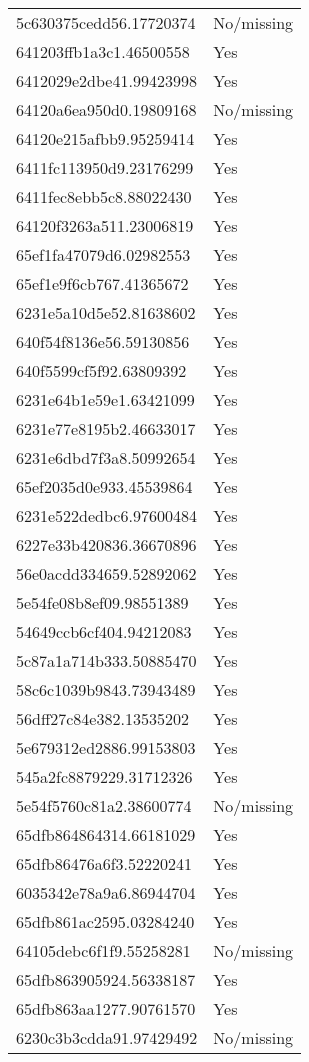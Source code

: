 \begin{tabular}{ll}
5c630375cedd56.17720374 & No/missing \\
641203ffb1a3c1.46500558 & Yes \\
6412029e2dbe41.99423998 & Yes \\
64120a6ea950d0.19809168 & No/missing \\
64120e215afbb9.95259414 & Yes \\
6411fc113950d9.23176299 & Yes \\
6411fec8ebb5c8.88022430 & Yes \\
64120f3263a511.23006819 & Yes \\
65ef1fa47079d6.02982553 & Yes \\
65ef1e9f6cb767.41365672 & Yes \\
6231e5a10d5e52.81638602 & Yes \\
640f54f8136e56.59130856 & Yes \\
640f5599cf5f92.63809392 & Yes \\
6231e64b1e59e1.63421099 & Yes \\
6231e77e8195b2.46633017 & Yes \\
6231e6dbd7f3a8.50992654 & Yes \\
65ef2035d0e933.45539864 & Yes \\
6231e522dedbc6.97600484 & Yes \\
6227e33b420836.36670896 & Yes \\
56e0acdd334659.52892062 & Yes \\
5e54fe08b8ef09.98551389 & Yes \\
54649ccb6cf404.94212083 & Yes \\
5c87a1a714b333.50885470 & Yes \\
58c6c1039b9843.73943489 & Yes \\
56dff27c84e382.13535202 & Yes \\
5e679312ed2886.99153803 & Yes \\
545a2fc8879229.31712326 & Yes \\
5e54f5760c81a2.38600774 & No/missing \\
65dfb864864314.66181029 & Yes \\
65dfb86476a6f3.52220241 & Yes \\
6035342e78a9a6.86944704 & Yes \\
65dfb861ac2595.03284240 & Yes \\
64105debc6f1f9.55258281 & No/missing \\
65dfb863905924.56338187 & Yes \\
65dfb863aa1277.90761570 & Yes \\
6230c3b3cdda91.97429492 & No/missing \\

\end{tabular}
